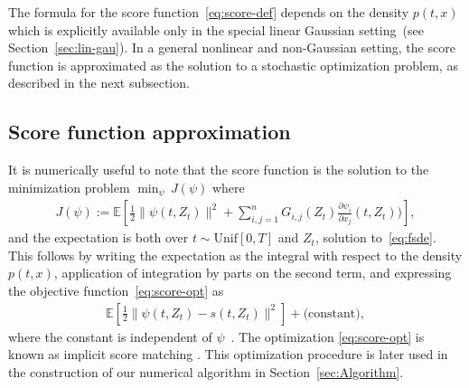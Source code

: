 \documentclass[letterpaper, 10 pt, conference]{ieeeconf}  %
\newcommand{\Ali}[1]{{\color{magenta}[Ali: #1]}}
\begin{document}
    The formula for the score function~\eqref{eq:score-def} depends on the density $p(t,x)$ which is explicitly available only in the special linear Gaussian setting~(see Section~\ref{sec:lin-gau}). In a general nonlinear and non-Gaussian setting, the score function  is approximated as the solution to a stochastic optimization problem, as described in the next subsection. 
\subsection{Score function approximation}
It is numerically useful to note that the score function is the solution to the minimization problem $\min_\psi\,J(\psi)$ where 
 \begin{align}\label{eq:score-opt}
       J(\psi):= \mathbb{E}[ \frac{1}{2}\|\psi(t,Z_t)\|^2 + \sum_{i,j=1}^n G_{i,j}(Z_t) \frac{\partial \psi_i}{\partial x_j} (t,Z_t)) ],
    \end{align}
    and the expectation is both over $t \sim \text{Unif}[0,T]$ and $Z_t$, solution to~\eqref{eq:fsde}. 
    This follows by writing the expectation as the integral with respect to the density $p(t,x)$, application of integration by parts on the second term,  and expressing the objective function~\eqref{eq:score-opt} as 
    \begin{align*}
        \mathbb{E}\left[ \frac{1}{2}\|\psi(t,Z_t)-s(t,Z_t)\|^2   \right] + \text{(constant)},
    \end{align*}
    where the constant is independent of $\psi$~\cite[Thm. 1]{hyvarinen2005estimation}. The optimization \eqref{eq:score-opt} is known as implicit score matching \cite{tang2024score}. This optimization procedure is later used in the construction of our numerical algorithm in Section~\ref{sec:Algorithm}.  

   
\end{document}

